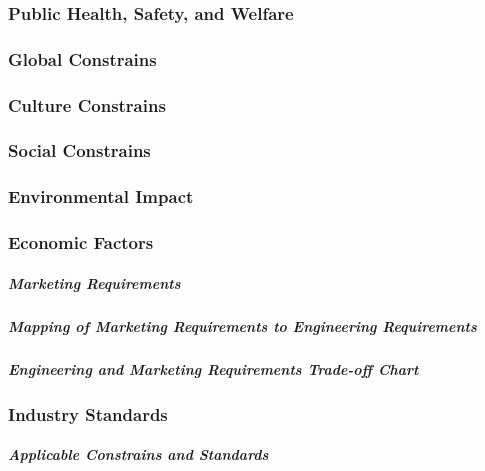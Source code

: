 \subsubsection{Public Health, Safety, and Welfare}
\subsubsection{Global Constrains}
\subsubsection{Culture Constrains}
\subsubsection{Social Constrains}
\subsubsection{Environmental Impact}
\subsubsection{Economic Factors}
\subparagraph{Marketing Requirements}
\subparagraph{Mapping of Marketing Requirements to Engineering Requirements}
\subparagraph{Engineering and Marketing Requirements Trade-off Chart}
\subsubsection{Industry Standards}
\subparagraph{Applicable Constrains and Standards}